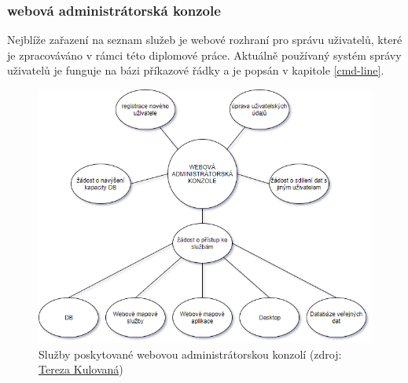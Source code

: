 \subsubsection{webová administrátorská konzole}

Nejblíže zařazení na seznam služeb je webové rozhraní pro správu uživatelů, které je zpracováváno v rámci této diplomové práce. Aktuálně používaný systém správy uživatelů je funguje na bázi příkazové řádky a je popsán v kapitole \ref{cmd-line}. 




\begin{figure}[H] \centering
    \includegraphics[width=350pt]{./pictures/console_services.png}
    \caption[Služby poskytované webovou administrátorskou konzolí]{Služby poskytované webovou administrátorskou konzolí (zdroj:
	\href{}{Tereza Kulovaná})}
    \label{fig:konzole-sluzby}
\end{figure}